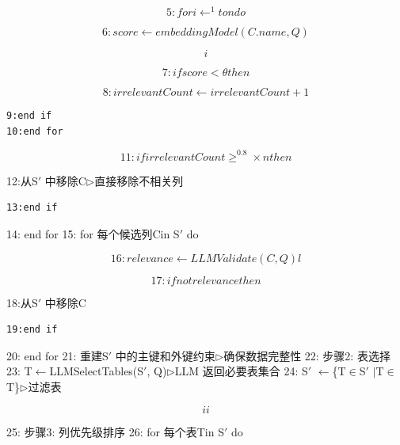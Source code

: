 \documentclass[12pt,a4paper,openright,UTF8]{ctexbook}
\begin{document}
\begin{equation*}
5:for i\leftarrow^1 to ndo
\end{equation*}

\begin{equation*}
6:score\leftarrow embeddingModel(C.name, Q)
\end{equation*}

\begin{equation*}
i
\end{equation*}

\begin{equation*}
7:if score< \theta then
\end{equation*}

\begin{equation*}
8:irrelevantCount\leftarrow irrelevantCount+ 1
\end{equation*}

\begin{lstlisting}
9:end if
10:end for
\end{lstlisting}

\begin{equation*}
11:if irrelevantCount\geq^0.8 \times nthen
\end{equation*}

12:从S$'$ 中移除C$\triangleright$直接移除不相关列

\begin{lstlisting}
13:end if
\end{lstlisting}
14: end for 15: for 每个候选列Cin S$'$ do

\begin{equation*}
16:relevance\leftarrow LLMValidate(C, Q)l
\end{equation*}

\begin{equation*}
17:if not relevancethen
\end{equation*}

18:从S$'$ 中移除C

\begin{lstlisting}
19:end if
\end{lstlisting}
20: end for 21: 重建S$'$ 中的主键和外键约束$\triangleright$确保数据完整性 22: 步骤2: 表选择 23: T$\leftarrow$LLMSelectTables(S$'$, Q)$\triangleright$LLM 返回必要表集合 24: S$'$ $\leftarrow$\{T$\in$S$'$ $|$T$\in$T\}$\triangleright$过滤表

\begin{equation*}
ii
\end{equation*}

25: 步骤3: 列优先级排序 26: for 每个表Tin S$'$ do
\end{document}
